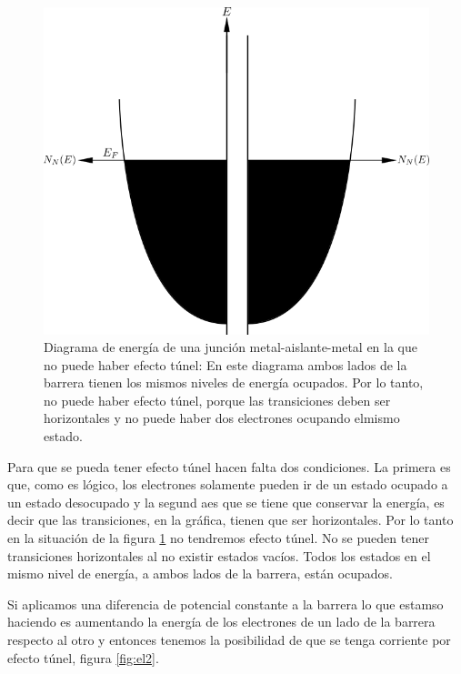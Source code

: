 \begin{figure}[H]
\centering \includegraphics[width=0.8\linewidth]{img/el1.png}
\caption[Diagrama de energía de una junción metal-aislante-metal en la que no puede haber efecto túnel]{Diagrama de energía de una junción metal-aislante-metal en la que no puede haber efecto túnel: En este diagrama ambos lados de la barrera tienen los mismos niveles de energía ocupados. Por lo tanto, no puede haber efecto túnel, porque las transiciones deben ser horizontales y no puede haber dos electrones ocupando elmismo estado.}
\label{fig:el1}
\end{figure}

Para que se pueda tener efecto túnel hacen falta dos condiciones. La primera es que, como es lógico, los electrones solamente pueden ir de un estado ocupado a un estado desocupado y la segund aes que se tiene que conservar la energía, es decir que las transiciones, en la gráfica, tienen que ser horizontales. Por lo tanto en la situación de la figura \ref{fig:el1} no tendremos efecto túnel. No se pueden tener transiciones horizontales al no existir estados vacíos. Todos los estados en el mismo nivel de energía, a ambos lados de la barrera, están ocupados.

Si aplicamos una diferencia de potencial constante a la barrera lo que estamso haciendo es aumentando la energía de los electrones de un lado de la barrera respecto al otro y entonces tenemos la posibilidad de que se tenga corriente por efecto túnel, figura \ref{fig:el2}.

